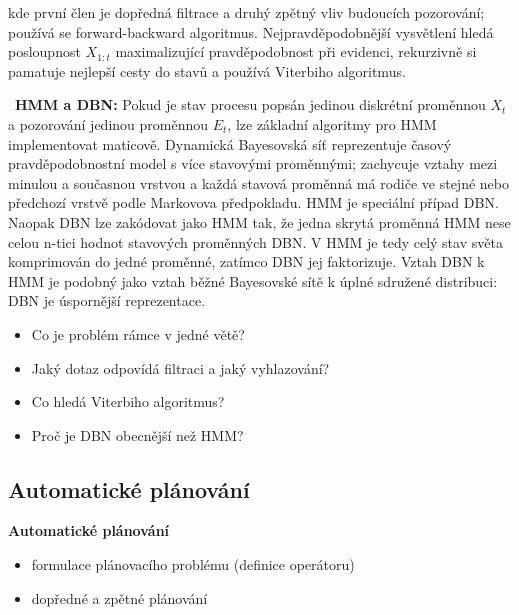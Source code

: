 \begin{odpoved}
\[\]
kde první člen je dopředná filtrace a druhý zpětný vliv budoucích pozorování; používá se forward-backward algoritmus. Nejpravděpodobnější vysvětlení hledá posloupnost $X_{1:t}$ maximalizující pravděpodobnost při evidenci, rekurzivně si pamatuje nejlepší cesty do stavů a používá Viterbiho algoritmus.\par
\noindent{}\ \textbf{HMM a DBN:} Pokud je stav procesu popsán jedinou diskrétní proměnnou $X_t$ a pozorování jedinou proměnnou $E_t$, lze základní algoritmy pro HMM implementovat maticově. Dynamická Bayesovská síť reprezentuje časový pravděpodobnostní model s více stavovými proměnnými; zachycuje vztahy mezi minulou a současnou vrstvou a každá stavová proměnná má rodiče ve stejné nebo předchozí vrstvě podle Markovova předpokladu. HMM je speciální případ DBN. Naopak DBN lze zakódovat jako HMM tak, že jedna skrytá proměnná HMM nese celou n-tici hodnot stavových proměnných DBN. V HMM je tedy celý stav světa komprimován do jedné proměnné, zatímco DBN jej faktorizuje. Vztah DBN k HMM je podobný jako vztah běžné Bayesovské sítě k úplné sdružené distribuci: DBN je úspornější reprezentace.
\end{odpoved}

\begin{recall}
\begin{itemize}[leftmargin=1.2em,itemsep=0pt,topsep=1pt]
  \item Co je problém rámce v jedné větě?
  \item Jaký dotaz odpovídá filtraci a jaký vyhlazování?
  \item Co hledá Viterbiho algoritmus?
  \item Proč je DBN obecnější než HMM?
\end{itemize}
\end{recall}

\subsection{Automatické plánování}

\begin{tema}
\textbf{Automatické plánování}
\begin{itemize}[leftmargin=1.2em,itemsep=0pt,topsep=1pt]
  \item formulace plánovacího problému (definice operátoru)
  \item dopředné a zpětné plánování
\end{itemize}
\end{tema}
\begin{vezkratce}
\end{vezkratce}

